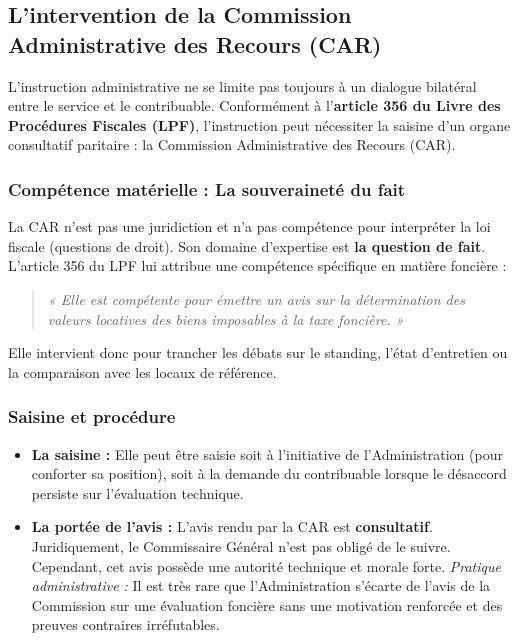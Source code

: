 \documentclass[Cours_contentieuxTF2026.tex]{subfiles}
\begin{document}
\subsection{L'intervention de la Commission Administrative des Recours (CAR)}

L'instruction administrative ne se limite pas toujours à un dialogue bilatéral entre le service et le contribuable. Conformément à l'\textbf{article 356 du Livre des Procédures Fiscales (LPF)}, l'instruction peut nécessiter la saisine d'un organe consultatif paritaire : la Commission Administrative des Recours (CAR).

\subsubsection{Compétence matérielle : La souveraineté du fait}

La CAR n'est pas une juridiction et n'a pas compétence pour interpréter la loi fiscale (questions de droit). Son domaine d'expertise est \textbf{la question de fait}.
L'article 356 du LPF lui attribue une compétence spécifique en matière foncière :
\begin{quote}
	\textit{« Elle est compétente pour émettre un avis sur la détermination des valeurs locatives des biens imposables à la taxe foncière. »}
\end{quote}
Elle intervient donc pour trancher les débats sur le standing, l'état d'entretien ou la comparaison avec les locaux de référence.

\subsubsection{Saisine et procédure}

\begin{itemize}
	\item \textbf{La saisine :} Elle peut être saisie soit à l'initiative de l'Administration (pour conforter sa position), soit à la demande du contribuable lorsque le désaccord persiste sur l'évaluation technique.
	
	\item \textbf{La portée de l'avis :} L'avis rendu par la CAR est \textbf{consultatif}. Juridiquement, le Commissaire Général n'est pas obligé de le suivre. Cependant, cet avis possède une autorité technique et morale forte.
	\textit{Pratique administrative :} Il est très rare que l'Administration s'écarte de l'avis de la Commission sur une évaluation foncière sans une motivation renforcée et des preuves contraires irréfutables.
\end{itemize}
\end{document}
